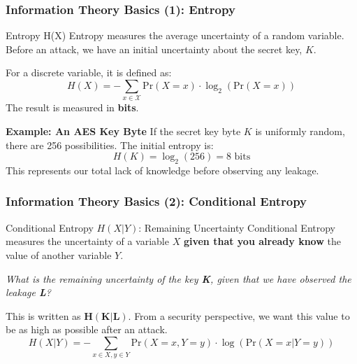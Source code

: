 \begin{frame}
    \frametitle{Information Theory Basics (1): Entropy}
    
    \begin{block}{Entropy H(X)}
        Entropy measures the average uncertainty of a random variable. Before an attack, we have an initial uncertainty about the secret key, $K$.
        
        For a discrete variable, it is defined as:
        $$ H(X) = - \sum_{x \in \mathcal{X}} \text{Pr}(X=x) \cdot \log_2(\text{Pr}(X=x)) $$
        The result is measured in \textbf{bits}.
    \end{block}
    
    \textbf{Example: An AES Key Byte} \newline
        If the secret key byte $K$ is uniformly random, there are 256 possibilities. The initial entropy is:
        $$ H(K) = \log_2(256) = 8 \text{ bits} $$
        This represents our total lack of knowledge before observing any leakage.
\end{frame}

\begin{frame}
    \frametitle{Information Theory Basics (2): Conditional Entropy}
    
    \begin{block}{Conditional Entropy $H(X|Y)$: Remaining Uncertainty}
        Conditional Entropy measures the uncertainty of a variable $X$ \textbf{given that you already know} the value of another variable $Y$.
        
        \vspace{0.3cm}
        
        \centering
        \textit{What is the remaining uncertainty of the key \textbf{K}, given that we have observed the leakage \textbf{L}?}
        
        \vspace{0.3cm}
        This is written as $\mathbf{H(K|L)}$. From a security perspective, we want this value to be as high as possible after an attack.
        $$H(X|Y)=-\sum_{x \in X, y \in Y}\text{Pr}(X=x,Y=y)\cdot\log(\text{Pr}(X=x|Y=y))$$
    \end{block}
\end{frame}

